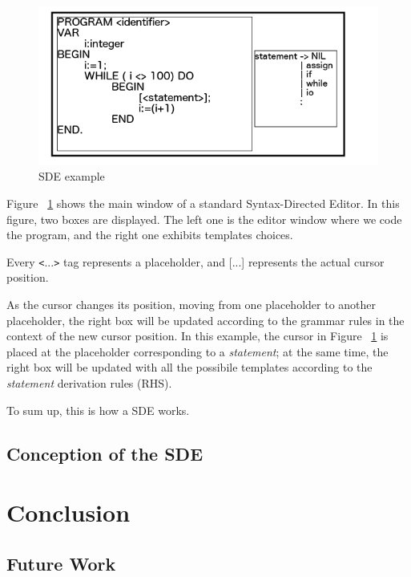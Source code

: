 \documentclass[
  oneside,
  11pt, a4paper,
  footinclude=true,
  headinclude=true,
  cleardoublepage=empty
]{scrbook}
\begin{document}
\begin{figure}[h!]
  \centering
    \includegraphics[width=1\textwidth]{img/SDE.png}
    \caption{SDE example}
    \label{fig:SDE}
\end{figure}


Figure ~\ref{fig:SDE} shows the main window of a standard Syntax-Directed Editor.
In this figure, two boxes are displayed.
The left one is the editor window where we code the program, and the right one exhibits templates choices.

Every \texttt{<}...\texttt{>}  tag represents a placeholder, and [...] represents the actual cursor position.

As the cursor changes its position, moving from one placeholder to another placeholder, the right box will be updated according to the grammar rules in the context of the new cursor position.
In this example, the cursor in Figure ~\ref{fig:SDE} is placed at the placeholder corresponding to a \textit{statement}; at the same time, the right box will be updated with all the possibile templates according to the \textit{statement} derivation rules (RHS).

To sum up, this is how a SDE works.

\section{Conception of the SDE}


\chapter{Conclusion}
\section{Future Work}
\end{document}
